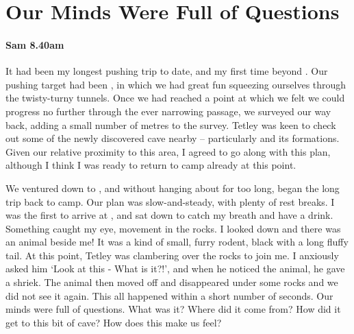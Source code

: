 \section{Our Minds Were Full of Questions}
\label{sec:creature}

\paragraph{Sam 8.40am}

It had been my longest pushing trip to date, and my first time beyond . Our pushing target had been , in which we had great fun squeezing ourselves through the twisty-turny tunnels. Once we had reached a point at which we felt we could progress no further through the ever narrowing passage, we surveyed our way back, adding a small number of metres to the survey. Tetley was keen to check out some of the newly discovered cave nearby – particularly  and its formations. Given our relative proximity to this area, I agreed to go along with this plan, although I think I was ready to return to camp already at this point.


We ventured down to , and without hanging about for too long, began the long trip back to camp. Our plan was slow-and-steady, with plenty of rest breaks. I was the first to arrive at , and sat down to catch my breath and have a drink. Something caught my eye, movement in the rocks. I looked down and there was an animal beside me! It was a kind of small, furry rodent, black with a long fluffy tail. At this point, Tetley was clambering over the rocks to join me. I anxiously asked him `Look at this - What is it?!', and when he noticed the animal, he gave a shriek. The animal then moved off and disappeared under some rocks and we did not see it again. This all happened within a short number of seconds. Our minds were full of questions. What was it? Where did it come from? How did it get to this bit of cave? How does this make us feel? 


